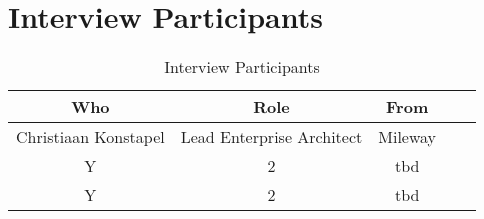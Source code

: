 \chapter{Interview Participants}
\label{app:interviewparticipants}

\begin{table}[!h]
	\begin{center}
		\begin{tabular}{@{}ccccc@{}}
			\toprule
			\textbf{Who} & \textbf{Role} & \textbf{From} \\ \midrule
			Christiaan Konstapel & Lead Enterprise Architect & Mileway \\
			Y    & 2    & tbd \\
			Y    & 2    & tbd \\ \bottomrule
		\end{tabular}
		\caption{Interview Participants}
		\label{tab:interviewparticipants}
	\end{center}
\end{table}
